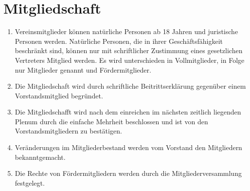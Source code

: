 \documentclass[ngerman]{scrartcl}
\begin{document}
\section{Mitgliedschaft} \label{sec:mitgliedschaft}
\begin{enumerate}
 \item Vereinsmitglieder können natürliche Personen ab 18 Jahren
 und  juristische Personen werden. Natürliche Personen, die in
 ihrer Geschäftsfähigkeit beschränkt sind, können nur mit
 schriftlicher Zustimmung eines gesetzlichen Vertreters
 Mitglied werden. Es wird unterschieden in Vollmitglieder, in
 Folge nur Mitglieder genannt und Fördermitglieder.
 \item Die Mitgliedschaft wird durch schriftliche
 Beitrittserklärung gegenüber einem Vorstandsmitglied
 begründet.
 \item Die Mitgliedschafft wird nach dem einreichen im nächsten zeitlich liegenden Plenum durch die einfache Mehrheit beschlossen und ist von den Vorstandsmitgliedern zu bestätigen.
 \item Veränderungen im Mitgliederbestand werden vom Vorstand
 den Mitgliedern bekanntgemacht.
 \item Die Rechte von Fördermitgliedern werden durch die
 Mitgliederversammlung festgelegt.
\end{enumerate}
\end{document}
